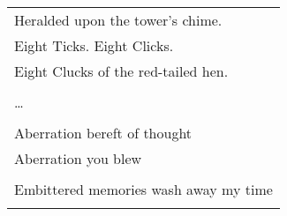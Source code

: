 \documentclass{article}
\begin{document}


\begin{center}
\begin{tabular}{l}
Heralded upon the tower's chime. \\
Eight Ticks. Eight Clicks. \\
Eight Clucks of the red-tailed hen. \\
\\
\ldots{} \\
\\
Aberration bereft of thought \\
Aberration you blew \\
\\
Embittered memories wash away my time \\
\\
\end{tabular}
\end{center}
\begin{center}
\begin{tabular}{l} %
%
\end{tabular}
\end{center}
\end{document}
